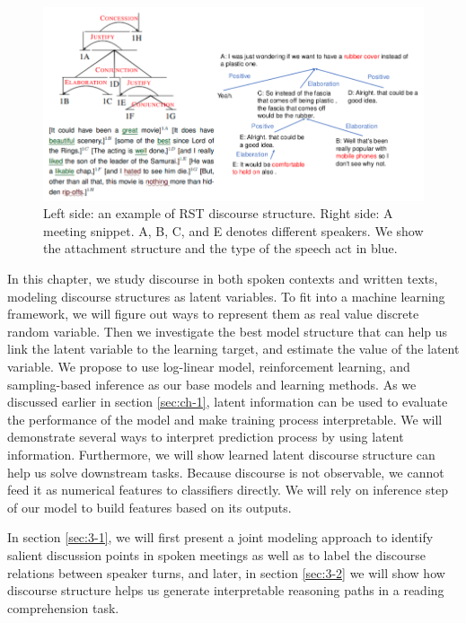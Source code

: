 \begin{figure}[t] 
\centering
\includegraphics[width=1.0\columnwidth]{Images/dis_intro.png} 
  \caption{Left side: an example of RST discourse structure. Right side:  A meeting snippet. A, B, C, and E denotes different speakers. We show the attachment structure and the type of the speech act in blue.}
\end{figure}\label{fig:dis_intro} 

In this chapter, we study discourse in both spoken contexts and written texts, modeling discourse structures as latent variables. To fit into a machine learning framework, we will figure out ways to represent them as real value discrete random variable. Then we investigate the best model structure that can help us link the latent variable to the learning target, and estimate the value of the latent variable. We propose to use log-linear model, reinforcement learning, and sampling-based inference as our base models and learning methods. As we discussed earlier in section \ref{sec:ch-1}, latent information can be used to evaluate the performance of the model and make training process interpretable. We will demonstrate several ways to interpret prediction process by using latent information. Furthermore, we will show learned latent discourse structure can help us solve downstream tasks. Because discourse is not observable, we cannot feed it as numerical features to classifiers directly. We will rely on inference step of our model to build features based on its outputs.

In section \ref{sec:3-1}, we will first present a joint modeling approach to identify salient discussion points in spoken meetings as well as to label the discourse relations between speaker turns, and later, in section \ref{sec:3-2} we will show how discourse structure helps us generate interpretable reasoning paths in a reading comprehension task.
